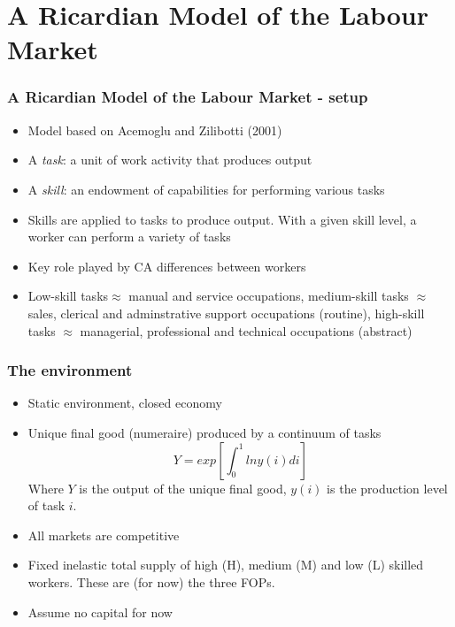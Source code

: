 \documentclass[mathserif]{beamer}
\begin{document}
\section{A Ricardian Model of the Labour Market}
\begin{frame}
\frametitle{A Ricardian Model of the Labour Market - setup}
\begin{itemize}
\item Model based on Acemoglu and Zilibotti (2001)
\item A \textit{task}: a unit of work activity that produces output
\item A \textit{skill}: an endowment of capabilities for performing various tasks
\item Skills are applied to tasks to produce output. With a given skill level, a worker can perform a variety of tasks
\item Key role played by CA differences between workers
\item Low-skill tasks$\approx$ manual and service occupations, medium-skill tasks $\approx$ sales, clerical and adminstrative support occupations (routine), high-skill tasks $\approx$ managerial, professional and technical occupations (abstract)
\end{itemize}
\end{frame}
\begin{frame}
\frametitle{The environment}
\begin{itemize}
\item Static environment, closed economy
\item Unique final good (numeraire) produced by a continuum of tasks
\begin{equation*}
Y=exp[\int_0^1lny(i)di]
\end{equation*}
Where $Y$ is the output of the unique final good, $y(i)$ is the production level of task $i$.
\item All markets are competitive
\item Fixed inelastic total supply of high (H), medium (M) and low (L) skilled workers. These are (for now) the three FOPs.
\item Assume no capital for now
\end{itemize}
\end{frame}
\end{document}

